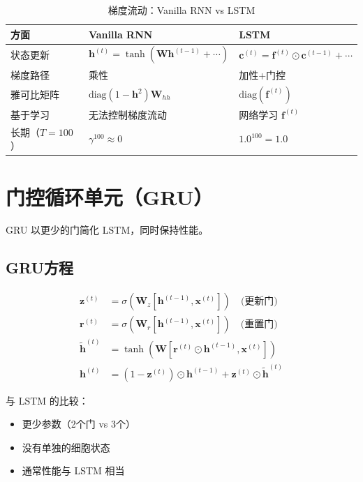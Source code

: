 \begin{table}[ht]
    \centering
    \caption{梯度流动：Vanilla RNN vs LSTM}
    \begin{tabular}{L{4cm} L{4.5cm} L{4.5cm}}
        \toprule
        \textbf{方面} & \textbf{Vanilla RNN} & \textbf{LSTM} \\
        \midrule
        状态更新 & $\mathbf{h}^{(t)} = \tanh(\mathbf{W}\mathbf{h}^{(t-1)} + \cdots)$ & $\mathbf{c}^{(t)} = \mathbf{f}^{(t)}\odot\mathbf{c}^{(t-1)} + \cdots$ \\
        梯度路径 & 乘性 & 加性+门控 \\
        雅可比矩阵 & $\text{diag}(1-\mathbf{h}^2)\mathbf{W}_{hh}$ & $\text{diag}(\mathbf{f}^{(t)})$ \\
        基于学习 & 无法控制梯度流动 & 网络学习 $\mathbf{f}^{(t)}$ \\
        长期（$T\!=\!100$） & $\gamma^{100} \approx 0$ & $1.0^{100} = 1.0$ \\
        \bottomrule
    \end{tabular}
\end{table}

\section{门控循环单元（GRU）}

GRU \cite{cho2014properties} 以更少的门简化 LSTM，同时保持性能。

\subsection{GRU方程}
\begin{align}
\mathbf{z}^{(t)} &= \sigma(\mathbf{W}_z[\mathbf{h}^{(t-1)}, \mathbf{x}^{(t)}]) \quad \text{(更新门)} \\
\mathbf{r}^{(t)} &= \sigma(\mathbf{W}_r[\mathbf{h}^{(t-1)}, \mathbf{x}^{(t)}]) \quad \text{(重置门)} \\
\tilde{\mathbf{h}}^{(t)} &= \tanh(\mathbf{W}[\mathbf{r}^{(t)} \odot \mathbf{h}^{(t-1)}, \mathbf{x}^{(t)}]) \\
\mathbf{h}^{(t)} &= (1 - \mathbf{z}^{(t)}) \odot \mathbf{h}^{(t-1)} + \mathbf{z}^{(t)} \odot \tilde{\mathbf{h}}^{(t)}
\end{align}

与 LSTM 的比较：
\begin{itemize}
    \item 更少参数（2个门 vs 3个）
    \item 没有单独的细胞状态
    \item 通常性能与 LSTM 相当
\end{itemize}

